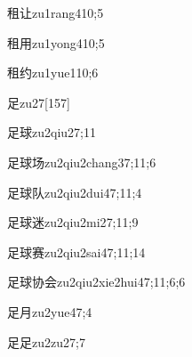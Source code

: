 \begin{verbete}{租让}{zu1rang4}{10;5}
\end{verbete}

\begin{verbete}{租用}{zu1yong4}{10;5}
\end{verbete}

\begin{verbete}{租约}{zu1yue1}{10;6}
\end{verbete}

\begin{verbete}{足}{zu2}{7}[157]
\end{verbete}

\begin{verbete}{足球}{zu2qiu2}{7;11}
\end{verbete}

\begin{verbete}{足球场}{zu2qiu2chang3}{7;11;6}
\end{verbete}

\begin{verbete}{足球队}{zu2qiu2dui4}{7;11;4}
\end{verbete}

\begin{verbete}{足球迷}{zu2qiu2mi2}{7;11;9}
\end{verbete}

\begin{verbete}{足球赛}{zu2qiu2sai4}{7;11;14}
\end{verbete}

\begin{verbete}{足球协会}{zu2qiu2xie2hui4}{7;11;6;6}
\end{verbete}

\begin{verbete}{足月}{zu2yue4}{7;4}
\end{verbete}

\begin{verbete}{足足}{zu2zu2}{7;7}
\end{verbete}

